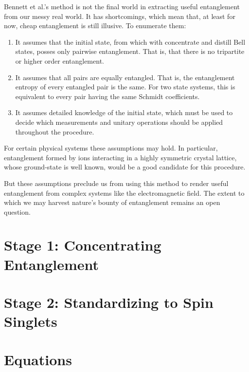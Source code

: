 \documentclass[12pt,letterpaper]{article}
\begin{document}
Bennett et al.'s method is not the final world in extracting useful entanglement from our messy real world.
It has shortcomings, which mean that, at least for now, cheap entanglement is still illusive. To enumerate them:
\begin{enumerate}
	\item It assumes that the initial state, from which with concentrate and distill Bell states, posses only pairwise entanglement. That is, that there is no tripartite or higher order entanglement.
	\item It assumes that all pairs are equally entangled. That is, the entanglement entropy of every entangled pair is the same. For two state systems, this is equivalent to every pair having the same Schmidt coefficients.
	\item It assumes detailed knowledge of the initial state, which must be used to decide which measurements and unitary operations should be applied throughout the procedure. 
\end{enumerate} 

For certain physical systems these assumptions may hold. In particular, entanglement formed by ions interacting in a highly symmetric crystal lattice, whose ground-state is well known, would be a good candidate for this procedure.

But these assumptions preclude us from using this method to render useful entanglement from complex systems like the electromagnetic field.
The extent to which we may harvest nature's bounty of entanglement remains an open question.


\section{Stage 1: Concentrating Entanglement}
\section{Stage 2: Standardizing to Spin Singlets}

\section{Equations}

\end{document}
